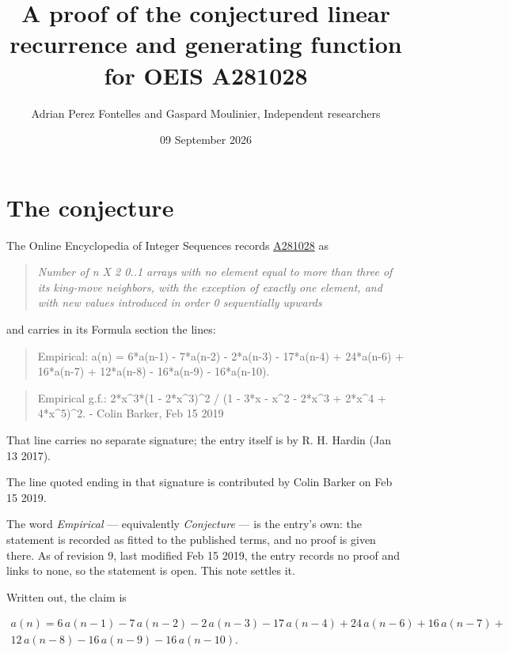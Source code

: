 \documentclass[11pt]{article}
\title{A proof of the conjectured linear recurrence and generating function for OEIS A281028}
\author{Adrian Perez Fontelles and Gaspard Moulinier, Independent researchers}
\date{09 September 2026}
\theoremstyle{definition}
\begin{document}
\maketitle
\section{The conjecture}

The Online Encyclopedia of Integer Sequences records \href{https://oeis.org/A281028}{A281028} as

\begin{quote}\itshape Number of n X 2 0..1 arrays with no element equal to more than three of its king-move neighbors, with the exception of exactly one element, and with new values introduced in order 0 sequentially upwards\end{quote}

and carries in its Formula section the lines:

\begin{quote}\ttfamily Empirical: a(n) = 6*a(n-1) - 7*a(n-2) - 2*a(n-3) - 17*a(n-4) + 24*a(n-6) + 16*a(n-7) + 12*a(n-8) - 16*a(n-9) - 16*a(n-10).\end{quote}

\begin{quote}\ttfamily Empirical g.f.: 2*x\textasciicircum{}3*(1 - 2*x\textasciicircum{}3)\textasciicircum{}2 / (1 - 3*x - x\textasciicircum{}2 - 2*x\textasciicircum{}3 + 2*x\textasciicircum{}4 + 4*x\textasciicircum{}5)\textasciicircum{}2. - Colin Barker, Feb 15 2019\end{quote}

That line carries no separate signature; the entry itself is by R. H. Hardin (Jan 13 2017).

The line quoted ending in that signature is contributed by Colin Barker on Feb 15 2019.

The word {\itshape Empirical} --- equivalently {\itshape Conjecture} --- is the entry's own: the statement is recorded as fitted to the published terms, and no proof is given there. As of revision 9, last modified Feb 15 2019, the entry records no proof and links to none, so the statement is open. This note settles it.

Written out, the claim is

\begin{multline*} a(n) = 6\,a(n-1) - 7\,a(n-2) - 2\,a(n-3) - 17\,a(n-4) + 24\,a(n-6) + 16\,a(n-7) + \\ 12\,a(n-8) - 16\,a(n-9) - 16\,a(n-10). \end{multline*}
\end{document}
